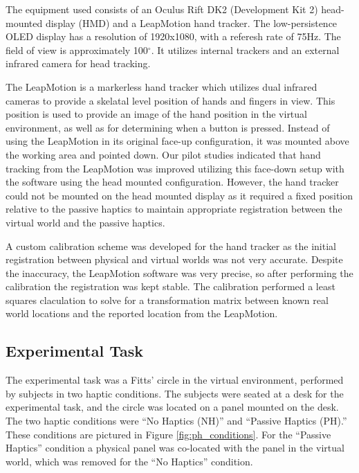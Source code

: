 The equipment used consists of an Oculus Rift DK2 (Development Kit 2) head-mounted display (HMD) and a LeapMotion hand tracker.
The low-persistence OLED display has a resolution of 1920x1080, with a referesh rate of 75Hz.
The field of view is approximately 100$^\circ$.
It utilizes internal trackers and an external infrared camera for head tracking.

The LeapMotion is a markerless hand tracker which utilizes dual infrared cameras to provide a skelatal level position of hands and fingers in view.
This position is used to provide an image of the hand position in the virtual environment, as well as for determining when a button is pressed.
Instead of using the LeapMotion in its original face-up configuration, it was mounted above the working area and pointed down.
Our pilot studies indicated that hand tracking from the LeapMotion was improved utilizing this face-down setup with the software using the head mounted configuration.
However, the hand tracker could not be mounted on the head mounted display as it required a fixed position relative to the passive haptics to maintain appropriate registration between the virtual world and the passive haptics.

A custom calibration scheme was developed for the hand tracker as the initial registration between physical and virtual worlds was not very accurate.
Despite the inaccuracy, the LeapMotion software was very precise, so after performing the calibration the registration was kept stable.
The calibration performed a least squares claculation to solve for a transformation matrix between known real world locations and the reported location from the LeapMotion.

\subsection{Experimental Task}

The experimental task was a Fitts' circle in the virtual environment, performed by subjects in two haptic conditions.
The subjects were seated at a desk for the experimental task, and the circle was located on a panel mounted on the desk.
The two haptic conditions were ``No Haptics (NH)'' and ``Passive Haptics (PH).''
These conditions are pictured in Figure \ref{fig:ph_conditions}.
For the ``Passive Haptics'' condition a physical panel was co-located with the panel in the virtual world, which was removed for the ``No Haptics'' condition.

